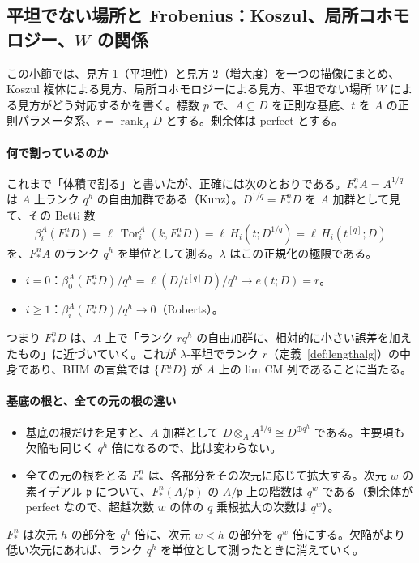 \documentclass[11pt,a4paper]{ltjsarticle}
\numberwithin{equation}{section}
\theoremstyle{plain}
\theoremstyle{definition}
\theoremstyle{definition}
\newcommand{\Tor}{\operatorname{Tor}}
\newcommand{\rank}{\operatorname{rank}}
\begin{document}
\subsection{平坦でない場所と Frobenius：Koszul、局所コホモロジー、$W$ の関係}\label{sec:intuition-W}

この小節では、見方 1（平坦性）と見方 2（増大度）を一つの描像にまとめ、Koszul 複体による見方、局所コホモロジーによる見方、平坦でない場所 $W$ による見方がどう対応するかを書く。標数 $p$ で、$A\subseteq D$ を正則な基底、$t$ を $A$ の正則パラメータ系、$r = \rank_A D$ とする。剰余体は perfect とする。

\paragraph{何で割っているのか}
これまで「体積で割る」と書いたが、正確には次のとおりである。$F^n_*A = A^{1/q}$ は $A$ 上ランク $q^h$ の自由加群である（Kunz）。$D^{1/q} = F^n_*D$ を $A$ 加群として見て、その Betti 数
\[
  \beta_i^A(F^n_*D) = \ell\,\Tor_i^A(k, F^n_*D) = \ell\,H_i(t; D^{1/q}) = \ell\,H_i(t^{[q]}; D)
\]
を、$F^n_*A$ のランク $q^h$ を単位として測る。$\lambda$ はこの正規化の極限である。
\begin{itemize}
  \item $i = 0$：$\beta_0^A(F^n_*D)/q^h = \ell(D/t^{[q]}D)/q^h\to e(t;D) = r$。
  \item $i\ge 1$：$\beta_i^A(F^n_*D)/q^h\to 0$（Roberts）。
\end{itemize}
つまり $F^n_*D$ は、$A$ 上で「ランク $r q^h$ の自由加群に、相対的に小さい誤差を加えたもの」に近づいていく。これが $\lambda$-平坦でランク $r$（定義~\ref{def:lengthalg}）の中身であり、BHM の言葉では $\{F^n_*D\}$ が $A$ 上の lim CM 列であることに当たる。

\paragraph{基底の根と、全ての元の根の違い}
\begin{itemize}
  \item 基底の根だけを足すと、$A$ 加群として $D\otimes_A A^{1/q}\cong D^{\oplus q^h}$ である。主要項も欠陥も同じく $q^h$ 倍になるので、比は変わらない。
  \item 全ての元の根をとる $F^n_*$ は、各部分をその次元に応じて拡大する。次元 $w$ の素イデアル $\mathfrak{p}$ について、$F^n_*(A/\mathfrak{p})$ の $A/\mathfrak{p}$ 上の階数は $q^w$ である（剰余体が perfect なので、超越次数 $w$ の体の $q$ 乗根拡大の次数は $q^w$）。
\end{itemize}
$F^n_*$ は次元 $h$ の部分を $q^h$ 倍に、次元 $w<h$ の部分を $q^w$ 倍にする。欠陥がより低い次元にあれば、ランク $q^h$ を単位として測ったときに消えていく。
\end{document}
